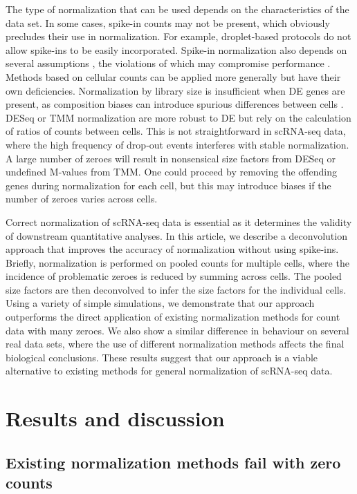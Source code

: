 \documentclass{bmcart}
\begin{document}
The type of normalization that can be used depends on the characteristics of the data set.
In some cases, spike-in counts may not be present, which obviously precludes their use in normalization.
For example, droplet-based protocols \cite{klein2015droplet,macosko2015highly} do not allow spike-ins to be easily incorporated.
Spike-in normalization also depends on several assumptions \cite{robinson2010scaling,marinov2014singlecell,grun2015design}, 
    the violations of which may compromise performance \cite{risso2014normalization}.
Methods based on cellular counts can be applied more generally but have their own deficiencies.
Normalization by library size is insufficient when DE genes are present, as composition biases can introduce spurious differences between cells \cite{robinson2010scaling}.
DESeq or TMM normalization are more robust to DE but rely on the calculation of ratios of counts between cells.
This is not straightforward in scRNA-seq data, where the high frequency of drop-out events interferes with stable normalization.
A large number of zeroes will result in nonsensical size factors from DESeq or undefined M-values from TMM.
One could proceed by removing the offending genes during normalization for each cell, but this may introduce biases if the number of zeroes varies across cells.

Correct normalization of scRNA-seq data is essential as it determines the validity of downstream quantitative analyses.
In this article, we describe a deconvolution approach that improves the accuracy of normalization without using spike-ins.
Briefly, normalization is performed on pooled counts for multiple cells, where the incidence of problematic zeroes is reduced by summing across cells.
The pooled size factors are then deconvolved to infer the size factors for the individual cells.
Using a variety of simple simulations, we demonstrate that our approach outperforms the direct application of existing normalization methods for count data with many zeroes.
We also show a similar difference in behaviour on several real data sets, where the use of different normalization methods affects the final biological conclusions.
These results suggest that our approach is a viable alternative to existing methods for general normalization of scRNA-seq data.

\section*{Results and discussion}

\subsection*{Existing normalization methods fail with zero counts}
\end{document}
